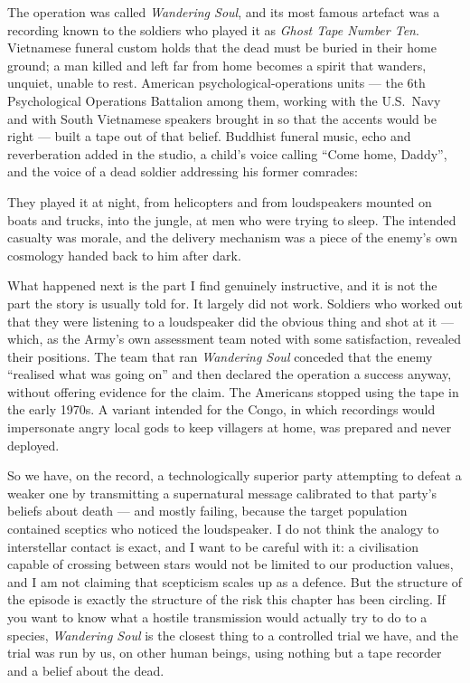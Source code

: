 The operation was called \emph{Wandering Soul}, and its most famous artefact was a recording known to
the soldiers who played it as \emph{Ghost Tape Number Ten}. Vietnamese funeral custom holds that the
dead must be buried in their home ground; a man killed and left far from home becomes a spirit that
wanders, unquiet, unable to rest. American psychological-operations units --- the 6th Psychological
Operations Battalion among them, working with the U.S.\ Navy and with South Vietnamese speakers
brought in so that the accents would be right --- built a tape out of that belief. Buddhist funeral
music, echo and reverberation added in the studio, a child's voice calling ``Come home, Daddy'', and
the voice of a dead soldier addressing his former comrades:


They played it at night, from helicopters and from loudspeakers mounted on boats and trucks, into the
jungle, at men who were trying to sleep.  The intended casualty was
morale, and the delivery mechanism was a piece of the enemy's own cosmology handed back to him after
dark.

What happened next is the part I find genuinely instructive, and it is not the part the story is
usually told for. It largely did not work. Soldiers who worked out that they were listening to a
loudspeaker did the obvious thing and shot at it --- which, as the Army's own assessment team noted
with some satisfaction, revealed their positions. The team that ran \emph{Wandering Soul} conceded
that the enemy ``realised what was going on'' and then declared the operation a success anyway,
without offering evidence for the claim. The Americans stopped using the tape in the early 1970s. A
variant intended for the Congo, in which recordings would impersonate angry local gods to keep
villagers at home, was prepared and never deployed.

So we have, on the record, a technologically superior party attempting to defeat a weaker one by
transmitting a supernatural message calibrated to that party's beliefs about death --- and mostly
failing, because the target population contained sceptics who noticed the loudspeaker. I do not think
the analogy to interstellar contact is exact, and I want to be careful with it: a civilisation
capable of crossing between stars would not be limited to our production values, and I am not
claiming that scepticism scales up as a defence. But the structure of the episode is exactly the
structure of the risk this chapter has been circling.  If you want to know what a hostile transmission would actually try to do to a
species, \emph{Wandering Soul} is the closest thing to a controlled trial we have, and the trial was
run by us, on other human beings, using nothing but a tape recorder and a belief about the dead.

